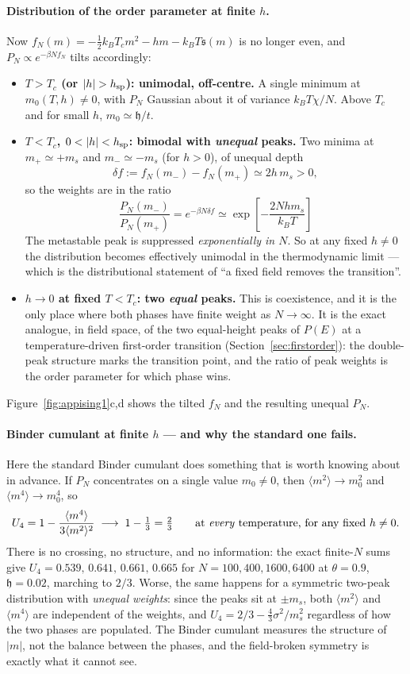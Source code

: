 \documentclass[10pt,a4paper]{article}
\theoremstyle{remark}
\begin{document}
\paragraph{Distribution of the order parameter at finite $h$.} Now
$f_N(m)=-\tfrac12k_BT_cm^{2}-hm-k_BT\mathfrak{s}(m)$ is no longer even, and
$P_N\propto e^{-\beta Nf_N}$ tilts accordingly:
\begin{itemize}
\item \textbf{$T>T_c$ (or $|h|>h_{\rm sp}$): unimodal, off-centre.} A single
minimum at $m_0(T,h)\neq0$, with $P_N$ Gaussian about it of variance
$k_BT\chi/N$. Above $T_c$ and for small $h$, $m_0\simeq\mathfrak{h}/t$.
\item \textbf{$T<T_c$, $0<|h|<h_{\rm sp}$: bimodal with \emph{unequal} peaks.}
Two minima at $m_+\simeq+m_s$ and $m_-\simeq-m_s$ (for $h>0$), of unequal depth
\[
\delta f:= f_N(m_-)-f_N(m_+)\simeq 2h\,m_s>0 ,
\]
so the weights are in the ratio
\[
\;
\frac{P_N(m_-)}{P_N(m_+)}=e^{-\beta N\delta f}
\simeq\exp\left[-\frac{2Nhm_s}{k_BT}\right]\
\]
The metastable peak is suppressed \emph{exponentially in $N$}. So at any fixed
$h\neq0$ the distribution becomes effectively unimodal in the thermodynamic
limit --- which is the distributional statement of ``a fixed field removes the
transition''.
\item \textbf{$h\to0$ at fixed $T<T_c$: two \emph{equal} peaks.} This is
coexistence, and it is the only place where both phases have finite weight as
$N\to\infty$. It is the exact analogue, in field space, of the two equal-height
peaks of $P(E)$ at a temperature-driven first-order transition
(Section~\ref{sec:firstorder}): the double-peak structure marks the transition
point, and the ratio of peak weights is the order parameter for which phase wins.
\end{itemize}
Figure~\ref{fig:appising1}c,d shows the tilted $f_N$ and the resulting unequal
$P_N$.

\paragraph{Binder cumulant at finite $h$ --- and why the standard one fails.}
Here the standard Binder cumulant does something that is worth knowing about in
advance. If $P_N$ concentrates on a single value $m_0\neq0$, then $\langle
m^{2}\rangle\to m_0^{2}$ and $\langle m^{4}\rangle\to m_0^{4}$, so
\[
\;U_4=1-\frac{\langle m^{4}\rangle}{3\langle m^{2}\rangle^{2}}
\;\longrightarrow\;1-\tfrac13=\tfrac23
\qquad\text{at \emph{every} temperature, for any fixed }h\neq0 .\
\]
There is no crossing, no structure, and no information: the exact finite-$N$ sums
give $U_4=0.539,\,0.641,\,0.661,\,0.665$ for $N=100,400,1600,6400$ at
$\theta=0.9$, $\mathfrak{h}=0.02$, marching to $2/3$. Worse, the same happens for
a symmetric two-peak distribution with \emph{unequal weights}: since the peaks sit
at $\pm m_s$, both $\langle m^{2}\rangle$ and $\langle m^{4}\rangle$ are
independent of the weights, and $U_4=2/3-\tfrac43\sigma^{2}/m_s^{2}$ regardless of
how the two phases are populated. The Binder cumulant measures the structure of
$|m|$, not the balance between the phases, and the field-broken symmetry is exactly
what it cannot see.
\end{document}
